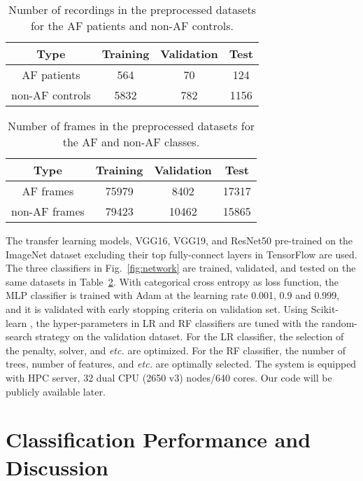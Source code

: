 \documentclass[journal]{IEEEtran}
\begin{document}
\begin{table}[H]
  \centering
  \caption{Number of recordings in the preprocessed datasets for the AF patients and non-AF controls.}
  \begin{tabular}{cccc}
  \hline
  Type  &  Training & Validation & Test\\
  \hline
  AF patients      &   564    &  70   & 124  \\
  non-AF controls  &   5832    &  782   & 1156  \\
  \hline
  \end{tabular}
  \label{tab:dataset-patient-AF}
\end{table}

\begin{table}[H]
  \centering
  \caption{Number of frames in the preprocessed datasets for the AF and non-AF classes.}
  \begin{tabular}{cccc}
  \hline
  Type  &  Training & Validation & Test\\
  \hline
  AF frames      &   75979    &  8402   & 17317  \\
  non-AF frames  &   79423    &  10462   & 15865  \\
  \hline
  \end{tabular}
  \label{tab:dataset-AF}
\end{table}

The transfer learning models, VGG16, VGG19, and ResNet50 pre-trained on the ImageNet dataset excluding their top fully-connect layers in TensorFlow\cite{tensorflow} are used. The three classifiers in Fig.~\ref{fig:network} are trained, validated, and tested on the same datasets in Table~\ref{tab:dataset-AF}. 
With categorical cross entropy as loss function, the MLP classifier is trained with Adam \cite{Adam_2015} at the learning rate 0.001,  0.9 and  0.999, and it is validated with early stopping criteria on validation set.
Using Scikit-learn \cite{scikit-learn}, the hyper-parameters in LR and RF classifiers are tuned with the random-search strategy on the validation dataset. For the LR classifier, the selection of the penalty, solver, and {\it etc.} are optimized. For the RF classifier, the number of trees, number of features, and {\it etc.} are optimally selected. 
The system is equipped with HPC server, 32 dual CPU (2650 v3) nodes/640 cores. Our code will be publicly available later.

\section{Classification Performance and Discussion} \label{sec:benchmark}
\end{document}
